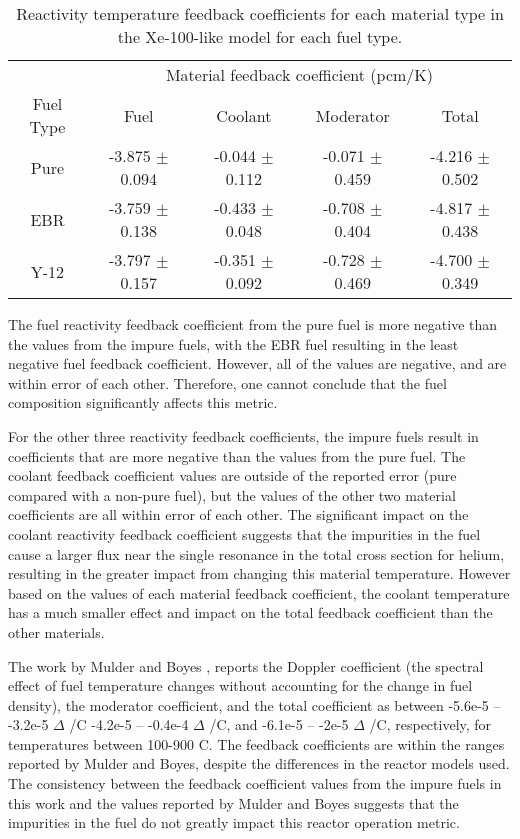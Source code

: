 \begin{table}[ht]
        \centering
        \caption{Reactivity temperature feedback coefficients for 
        each material type in the Xe-100-like model for each fuel 
        type.}
        \label{tab:coeff_xe100}
        \begin{tabular}{c c c c c}
            \hline 
            & \multicolumn{4}{c}{Material feedback coefficient (pcm/K)} \\
            Fuel Type & Fuel & Coolant & Moderator & Total \\
            \hline
            Pure & -3.875 $\pm$ 0.094 & -0.044 $\pm$ 0.112 & -0.071 $\pm$ 0.459 & -4.216 $\pm$ 0.502\\
            \gls{EBR} & -3.759 $\pm$ 0.138 & -0.433 $\pm$ 0.048 & -0.708 $\pm$ 0.404 & -4.817 $\pm$ 0.438\\
            Y-12 & -3.797 $\pm$ 0.157 & -0.351 $\pm$ 0.092 & -0.728 $\pm$ 0.469 & -4.700 $\pm$ 0.349\\
            \hline

        \end{tabular}
\end{table}

The fuel reactivity feedback coefficient from the pure fuel is more 
negative than the values from the impure fuels, with the \gls{EBR} fuel 
resulting in the least negative fuel feedback coefficient. However, all of 
the values are negative, and are within error of each other. Therefore, 
one cannot conclude that the fuel composition significantly affects this metric. 

For the other three reactivity feedback coefficients, the impure fuels 
result in coefficients that are more negative than the values from 
the pure fuel. The coolant feedback coefficient values are outside 
of the reported error (pure compared with a non-pure fuel), but the 
values of the other two material coefficients are all within error of 
each other. The significant impact on the coolant reactivity feedback 
coefficient suggests that the impurities in the fuel cause a larger 
flux near the single resonance in the total cross section for helium,
resulting in the greater impact from changing this material temperature. 
However based on the values of each material feedback coefficient, 
the coolant temperature has a much smaller effect and impact on the 
total feedback coefficient than the other materials. 

The work by Mulder and Boyes \cite{mulder_neutronics_2020}, reports 
the Doppler coefficient (the spectral effect of fuel temperature changes 
without accounting for the change in fuel density), the moderator coefficient, 
and the total coefficient as between -5.6e-5 -- -3.2e-5 $\Delta$ 
\keff/\textdegree C
-4.2e-5 -- -0.4e-4 $\Delta$ \keff/\textdegree C, and -6.1e-5 -- -2e-5 
$\Delta$ \keff/\textdegree C, respectively, for temperatures between 100-900
\textdegree C. The feedback coefficients are within the ranges reported 
by Mulder and Boyes, despite the differences in the reactor models used.
The consistency between the feedback coefficient values from the impure 
fuels in this work and the values reported by Mulder and Boyes suggests that 
the impurities in the fuel do not greatly impact this reactor operation 
metric.  

